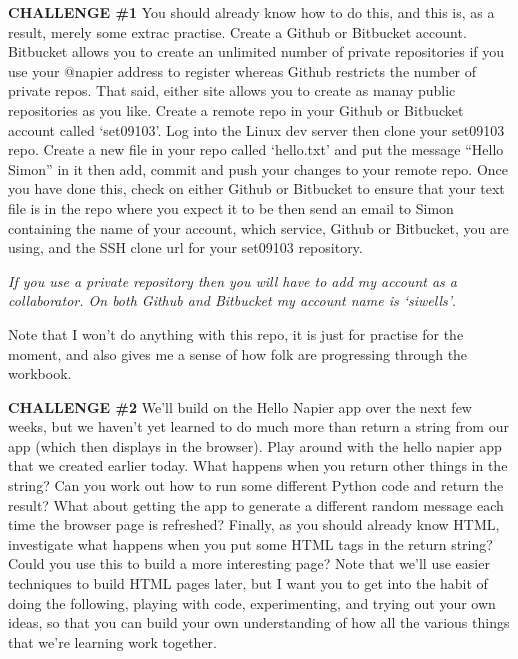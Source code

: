 \documentclass[12pt, a4paper, oneside]{book}
\begin{document}
\begin{framed}
\textbf{CHALLENGE \#1} You should already know how to do this, and this is, as a result, merely some extrac practise. Create a Github or Bitbucket account. Bitbucket allows you to create an unlimited number of private repositories if you use your @napier address to register whereas Github restricts the number of private repos. That said, either site allows you to create as manay public repositories as you like. Create a remote repo in your Github or Bitbucket account called `set09103'. Log into the Linux dev server then clone your set09103 repo. Create a new file in your repo called `hello.txt' and put the message ``Hello Simon'' in it then add, commit and push your changes to your remote repo. Once you have done this, check on either Github or Bitbucket to ensure that your text file is in the repo where you expect it to be then send an email to Simon containing the name of your account, which service, Github or Bitbucket, you are using, and the SSH clone url for your set09103 repository. 

{\emph{If you use a private repository then you will have to add my account as a collaborator. On both Github and Bitbucket my account name is `siwells'}}. 

Note that I won't do anything with this repo, it is just for practise for the moment, and also gives me a sense of how folk are progressing through the workbook.
\end{framed}
\begin{framed}
\textbf{CHALLENGE \#2} We'll build on the Hello Napier app over the next few weeks, but we haven't yet learned to do much more than return a string from our app (which then displays in the browser). Play around with the hello napier app that we created earlier today. What happens when you return other things in the string? Can you work out how to run some different Python code and return the result? What about getting the app to generate a different random message each time the browser page is refreshed? Finally, as you should already know HTML, investigate what happens when you put some HTML tags in the return string? Could you use this to build a more interesting page? Note that we'll use easier techniques to build HTML pages later, but I want you to get into the habit of doing the following, playing with code, experimenting, and trying out your own ideas, so that you can build your own understanding of how all the various things that we're learning work together.
\end{framed}
\end{document}
